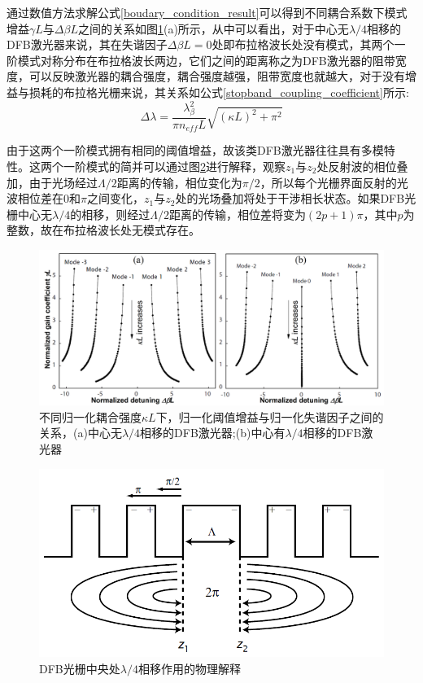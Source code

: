 通过数值方法求解公式\ref{boudary_condition_result}可以得到不同耦合系数下模式增益$\gamma L$与$\Delta\beta L$之间的关系如图\ref{fab_stopband}(a)所示，从中可以看出，对于中心无$\lambda/4$相移的DFB激光器来说，其在失谐因子$\Delta\beta L=0$处即布拉格波长处没有模式，其两个一阶模式对称分布在布拉格波长两边，它们之间的距离称之为DFB激光器的阻带宽度，可以反映激光器的耦合强度，耦合强度越强，阻带宽度也就越大，对于没有增益与损耗的布拉格光栅来说，其关系如公式\ref{stopband_coupling_coefficient}所示:
\begin{equation}
\label{stopband_coupling_coefficient}
\Delta\lambda = \dfrac{\lambda_\beta^2}{\pi n_{eff}L}\sqrt{(\kappa L)^2+\pi^2}
\end{equation}

由于这两个一阶模式拥有相同的阈值增益，故该类DFB激光器往往具有多模特性。这两个一阶模式的简并可以通过图\ref{fab_lambda_4_explanation}进行解释，观察$z_1$与$z_2$处反射波的相位叠加，由于光场经过$\Lambda/2$距离的传输，相位变化为$\pi/2$，所以每个光栅界面反射的光波相位差在$0$和$\pi$之间变化，$z_1$与$z_2$处的光场叠加将处于干涉相长状态。如果DFB光栅中心无$\lambda/4$的相移，则经过$\Lambda/2$距离的传输，相位差将变为$(2p+1)\pi$，其中$p$为整数，故在布拉格波长处无模式存在。

\begin{figure}[htb]
	\centering
	\includegraphics[width=16cm]{./Pictures/fab_stopband.jpg}
	\captionsetup{justification=centering}
	\caption{不同归一化耦合强度$\kappa L$下，归一化阈值增益与归一化失谐因子之间的关系，(a)中心无$\lambda/4$相移的DFB激光器;(b)中心有$\lambda/4$相移的DFB激光器\cite{huybrechts2010digital}}
	\label{fab_stopband}
\end{figure}

\begin{figure}[htb]
	\centering
	\includegraphics[width=12cm]{./Pictures/fab_multimode_explanation.png}
	\captionsetup{justification=centering}
	\caption{DFB光栅中央处$\lambda/4$相移作用的物理解释\cite{morthier2013handbook}}
	\label{fab_lambda_4_explanation}
\end{figure}

